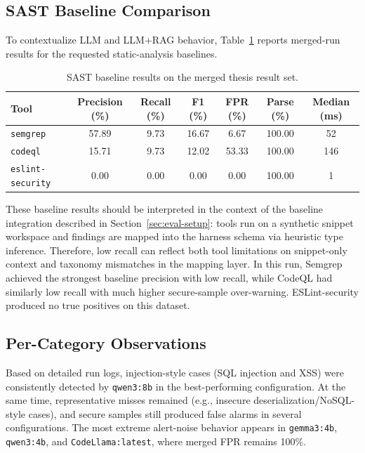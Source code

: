 \subsection*{SAST Baseline Comparison}

To contextualize LLM and LLM+RAG behavior, Table~\ref{tab:eval-baseline-summary} reports merged-run results for the requested static-analysis baselines.

\begin{table}[H]
  \centering
  \caption{SAST baseline results on the merged thesis result set.}
  \label{tab:eval-baseline-summary}
  \small
  \begin{tabular}{lcccccc}
    \toprule
    Tool & Precision (\%) & Recall (\%) & F1 (\%) & FPR (\%) & Parse (\%) & Median (ms) \\
    \midrule
    \texttt{semgrep} & 57.89 & 9.73 & 16.67 & 6.67 & 100.00 & 52 \\
    \texttt{codeql} & 15.71 & 9.73 & 12.02 & 53.33 & 100.00 & 146 \\
    \texttt{eslint-security} & 0.00 & 0.00 & 0.00 & 0.00 & 100.00 & 1 \\
    \bottomrule
  \end{tabular}
\end{table}

These baseline results should be interpreted in the context of the baseline integration described in Section~\ref{sec:eval-setup}: tools run on a synthetic snippet workspace and findings are mapped into the harness schema via heuristic type inference. Therefore, low recall can reflect both tool limitations on snippet-only context and taxonomy mismatches in the mapping layer. In this run, Semgrep achieved the strongest baseline precision with low recall, while CodeQL had similarly low recall with much higher secure-sample over-warning. ESLint-security produced no true positives on this dataset.

\subsection*{Per-Category Observations}

Based on detailed run logs, injection-style cases (SQL injection and XSS) were consistently detected by \texttt{qwen3:8b} in the best-performing configuration. At the same time, representative misses remained (e.g., insecure deserialization/NoSQL-style cases), and secure samples still produced false alarms in several configurations. The most extreme alert-noise behavior appears in \texttt{gemma3:4b}, \texttt{qwen3:4b}, and \texttt{CodeLlama:latest}, where merged FPR remains 100\%.

